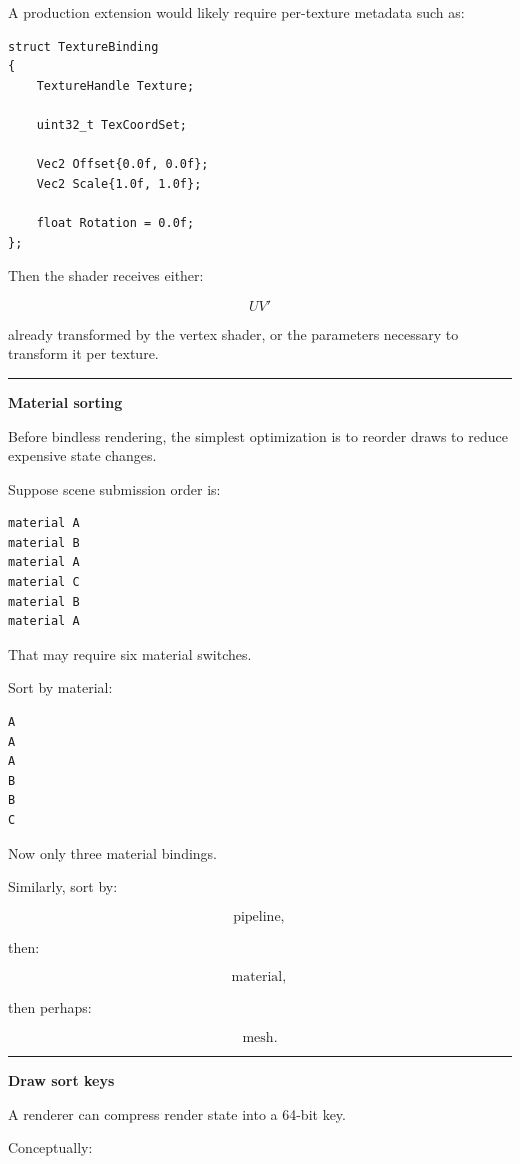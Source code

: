 A production extension would likely require per-texture metadata such as:

\begin{verbatim}
struct TextureBinding
{
    TextureHandle Texture;

    uint32_t TexCoordSet;

    Vec2 Offset{0.0f, 0.0f};
    Vec2 Scale{1.0f, 1.0f};

    float Rotation = 0.0f;
};
\end{verbatim}

Then the shader receives either:

\[
UV'
\]

already transformed by the vertex shader, or the parameters necessary to transform it per texture.

\begin{center}\rule{0.5\linewidth}{0.5pt}\end{center}

\textbf{Material sorting}

Before bindless rendering, the simplest optimization is to reorder draws to reduce expensive state changes.

Suppose scene submission order is:

\begin{verbatim}
material A
material B
material A
material C
material B
material A
\end{verbatim}

That may require six material switches.

Sort by material:

\begin{verbatim}
A
A
A
B
B
C
\end{verbatim}

Now only three material bindings.

Similarly, sort by:

\[
\text{pipeline},
\]

then:

\[
\text{material},
\]

then perhaps:

\[
\text{mesh}.
\]

\begin{center}\rule{0.5\linewidth}{0.5pt}\end{center}

\textbf{Draw sort keys}

A renderer can compress render state into a 64-bit key.

Conceptually:

